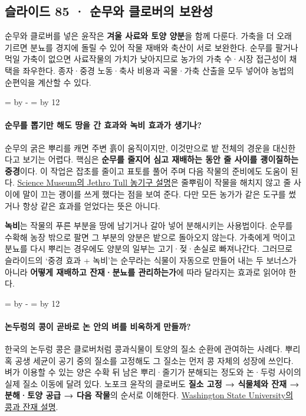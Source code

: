 \documentclass[10pt,a4paper]{article}
\newcommand{\ReserveQuestionSpace}{%
  \par\begingroup
  \dimen0=\pagegoal \advance\dimen0 by -\pagetotal
  \dimen2=\baselineskip \multiply\dimen2 by 12
  \ifdim\dimen0<\dimen2 \newpage\fi
  \endgroup}
\begin{document}
\subsection{슬라이드 85 · 순무와 클로버의 보완성}
순무와 클로버를 넣은 윤작은 \textbf{겨울 사료와 토양 양분}을 함께 다룬다. 가축을 더 오래 기르면 분뇨를 경지에 돌릴 수 있어 작물 재배와 축산이 서로 보완한다. 순무를 팔거나 먹일 가축이 없으면 사료작물의 가치가 낮아지므로 농가의 가축 수·시장 접근성이 채택을 좌우한다. 종자·중경 노동·축사 비용과 곡물·가축 산출을 모두 넣어야 농법의 순편익을 계산할 수 있다.\par

\ReserveQuestionSpace
\paragraph{순무를 뽑기만 해도 땅을 간 효과와 녹비 효과가 생기나?}
순무의 굵은 뿌리를 캐면 주변 흙이 움직이지만, 이것만으로 밭 전체의 경운을 대신한다고 보기는 어렵다. 핵심은 \textbf{순무를 줄지어 심고 재배하는 동안 줄 사이를 괭이질하는 중경}이다. 이 작업은 잡초를 줄이고 표토를 풀어 주며 다음 작물의 준비에도 도움이 된다. \href{https://collection.sciencemuseumgroup.org.uk/objects/co39077/1-4-scale-model-of-jethro-tulls-seed-drill}{Science Museum의 Jethro Tull 농기구 설명}은 줄뿌림이 작물을 해치지 않고 줄 사이에 말이 끄는 괭이를 쓰게 했다는 점을 보여 준다. 다만 모든 농가가 같은 도구를 썼거나 항상 같은 효과를 얻었다는 뜻은 아니다.\par

\textbf{녹비}는 작물의 푸른 부분을 땅에 남기거나 갈아 넣어 분해시키는 사용법이다. 순무를 수확해 농장 밖으로 팔면 그 부분의 양분은 밭으로 돌아오지 않는다. 가축에게 먹이고 분뇨를 다시 뿌리는 경우에도 양분의 일부는 고기·젖·손실로 빠져나간다. 그러므로 슬라이드의 ‘중경 효과 + 녹비’는 순무라는 식물이 자동으로 만들어 내는 두 보너스가 아니라 \textbf{어떻게 재배하고 잔재·분뇨를 관리하는가}에 따라 달라지는 효과로 읽어야 한다.\par

\ReserveQuestionSpace
\paragraph{논두렁의 콩이 곧바로 논 안의 벼를 비옥하게 만들까?}

한국의 논두렁 콩은 클로버처럼 콩과식물이 토양의 질소 순환에 관여하는 사례다. 뿌리혹 공생 세균이 공기 중의 질소를 고정해도 그 질소는 먼저 콩 자체의 성장에 쓰인다. 벼가 이용할 수 있는 양은 수확 뒤 남은 뿌리·줄기가 분해되는 정도와 논·두렁 사이의 실제 질소 이동에 달려 있다. 노포크 윤작의 클로버도 \textbf{질소 고정 → 식물체와 잔재 → 분해·토양 공급 → 다음 작물}의 순서로 이해한다. \href{https://pubs.extension.wsu.edu/product/methods-for-successful-cover-crop-management-in-your-home-garden-series/}{Washington State University의 콩과 잔재 설명}.\par
\end{document}
